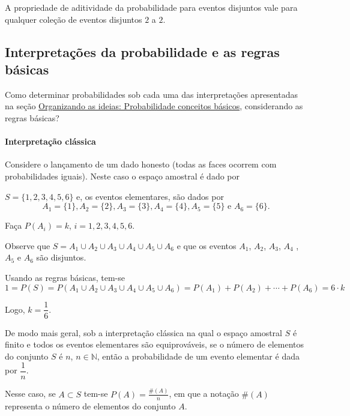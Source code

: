 A propriedade de aditividade da probabilidade para eventos disjuntos vale para qualquer coleção de eventos disjuntos $2$ a $2$.


\subsection{Interpretações da probabilidade e as regras básicas}

Como determinar probabilidades sob cada uma das interpretações apresentadas na seção \hyperref[organizandoconceitosbasicos]{Organizando as ideias: Probabilidade \textendash{} conceitos básicos}, considerando as regras básicas?

\paragraph{Interpretação clássica}

\begin{example}{}

Considere o lançamento de um dado honesto (todas as faces ocorrem com probabilidades iguais). Neste caso o espaço amostral é dado por

\(S=\{ 1,2,3,4,5,6\}\) e, os eventos elementares, são dados por
$$A_1=\{1\}, A_2=\{2\}, A_3=\{3\}, A_4=\{4\}, A_5=\{5\} \text{ e } A_6=\{6\}.$$

Faça \(P(A_i)=k\), \(i=1,2,3,4,5,6\).

Observe que \(S=A_1\cup A_2\cup A_3\cup A_4\cup A_5 \cup A_6\) e que os eventos \(A_1\), \(A_2\), \(A_3\), \(A_4\) , \(A_5\) e \(A_6\) são disjuntos.

Usando as regras básicas, tem-se
$$1=P(S)=P(A_1\cup A_2\cup A_3\cup A_4\cup A_5 \cup A_6)=P(A_1)+P(A_2)+\cdots +P(A_6)=6\cdot k$$

Logo, \(k=\dfrac{1}{6}\).
\end{example}

De modo mais geral, sob a interpretação clássica na qual o espaço amostral \(S\) é finito e todos os eventos elementares são equiprováveis, se o número de elementos do conjunto \(S\) é \(n\), \(n\in \mathbb{N}\), então a probabilidade de um evento elementar é dada por \(\dfrac{1}{n}\).

Nesse caso, se \(A\subset S\) tem-se $\displaystyle{P(A)=\frac{\#(A)}{n}}$, em que a notação \(\#(A)\) representa o número de elementos do conjunto \(A\).

